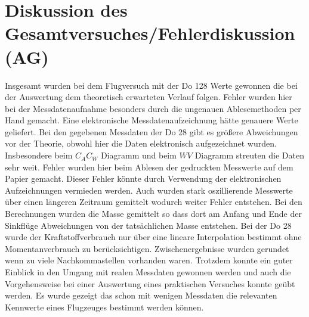 \section{Diskussion des Gesamtversuches/Fehlerdiskussion (AG)}
Insgesamt wurden bei dem Flugversuch mit der Do 128 Werte gewonnen die bei der Auswertung dem theoretisch erwarteten Verlauf folgen. Fehler wurden hier bei der Messdatenaufnahme besonders durch die ungenauen Ablesemethoden per Hand gemacht. Eine elektronische Messdatenaufzeichnung hätte genauere Werte geliefert.
Bei den gegebenen Messdaten der Do 28 gibt es größere Abweichungen vor der Theorie, obwohl hier die Daten elektronisch aufgezeichnet wurden. Insbesondere beim $C_A C_W$ Diagramm und beim $W V$ Diagramm streuten die Daten sehr weit. Fehler wurden hier beim Ablesen der gedruckten Messwerte auf dem Papier gemacht. Dieser Fehler könnte durch Verwendung der elektronischen Aufzeichnungen vermieden werden. Auch wurden stark oszillierende Messwerte über einen längeren Zeitraum gemittelt wodurch weiter Fehler entstehen.
Bei den Berechnungen wurden die Masse gemittelt so dass dort am Anfang und Ende der Sinkflüge Abweichungen von der tatsächlichen Masse entstehen. Bei der Do 28 wurde der Kraftstoffverbrauch nur über eine lineare Interpolation bestimmt ohne Momentanverbrauch zu berücksichtigen. Zwischenergebnisse wurden gerundet wenn zu viele Nachkommastellen vorhanden waren.
Trotzdem konnte ein guter Einblick in den Umgang mit realen Messdaten gewonnen werden und auch die Vorgehensweise bei einer Auswertung eines praktischen Versuches konnte geübt werden.  Es wurde gezeigt das schon mit wenigen Messdaten die relevanten Kennwerte eines Flugzeuges bestimmt werden können.